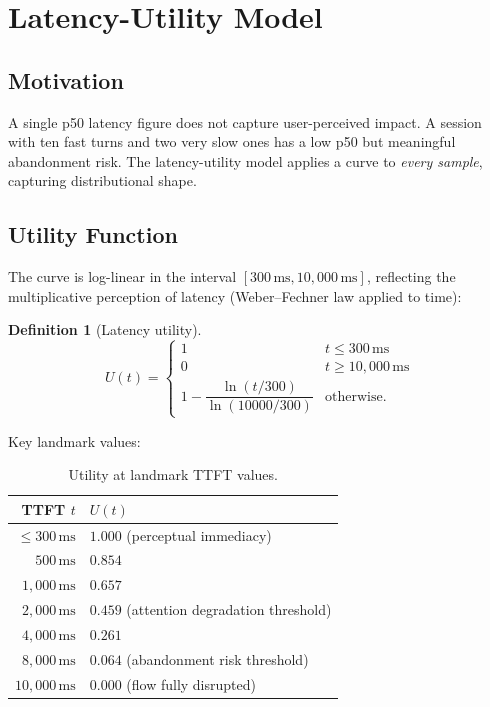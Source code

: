 \documentclass[11pt,a4paper]{article}
\newtheorem{definition}{Definition}
\begin{document}
\section{Latency-Utility Model}
\label{sec:latency-utility}

\subsection{Motivation}

A single p50 latency figure does not capture user-perceived impact.  A session
with ten fast turns and two very slow ones has a low p50 but meaningful
abandonment risk.  The latency-utility model applies a curve to \emph{every
sample}, capturing distributional shape.

\subsection{Utility Function}

The curve is log-linear in the interval $[300\,\text{ms}, 10{,}000\,\text{ms}]$,
reflecting the multiplicative perception of latency (Weber--Fechner law applied
to time):

\begin{definition}[Latency utility]
\[
  U(t) =
  \begin{cases}
    1 & t \leq 300\,\text{ms} \\[4pt]
    0 & t \geq 10{,}000\,\text{ms} \\[4pt]
    1 - \dfrac{\ln(t/300)}{\ln(10000/300)} & \text{otherwise.}
  \end{cases}
\]
\end{definition}

Key landmark values:

\begin{table}[h!]
\centering
\caption{Utility at landmark TTFT values.}
\begin{tabular}{@{}rl@{}}
\toprule
TTFT $t$ & $U(t)$ \\
\midrule
$\leq 300\,\text{ms}$ & $1.000$ (perceptual immediacy) \\
$500\,\text{ms}$ & $0.854$ \\
$1{,}000\,\text{ms}$ & $0.657$ \\
$2{,}000\,\text{ms}$ & $0.459$ (attention degradation threshold) \\
$4{,}000\,\text{ms}$ & $0.261$ \\
$8{,}000\,\text{ms}$ & $0.064$ (abandonment risk threshold) \\
$10{,}000\,\text{ms}$ & $0.000$ (flow fully disrupted) \\
\bottomrule
\end{tabular}
\end{table}
\end{document}
